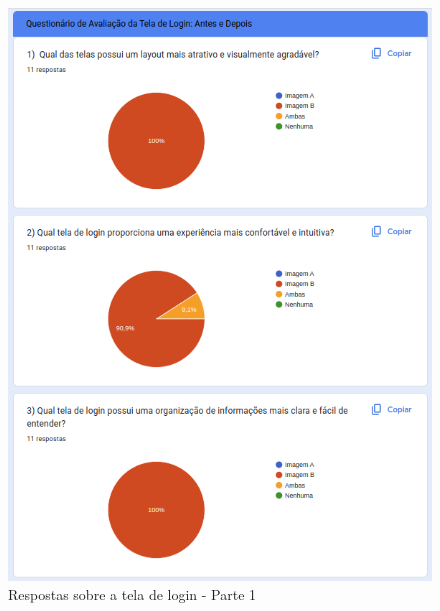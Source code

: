 \begin{figure}[!h]
	\begin{center}
	    \includegraphics[scale=0.7]{figs/Answers/Professionals/04.png}
	\end{center}
	\caption{\label{APC_TL01}Respostas sobre a tela de login - Parte 1}
\end{figure}

\newpage

